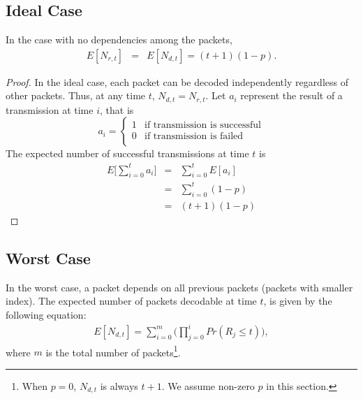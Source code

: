 \subsection{Ideal Case}
\begin{theorem}
\label{t:model:ideal}
    In the case with no dependencies among the packets,
    \begin{eqnarray*}
    E[N_{r,t}] &=& E[N_{d,t}] = (t+1)(1-p).
    \end{eqnarray*}
\end{theorem}
    \begin{proof}
    In the ideal case, each packet can be decoded independently
    regardless of other packets.  Thus, at any time $t$,
    $N_{d,t} = N_{r,t}$.
    Let $a_i$ represent the result of a transmission at time $i$,  
    that is
    \begin{displaymath}
    a_i = \left\{\begin{array}{ll}
    1 & \textrm{if transmission is successful}\\
    0 & \textrm{if transmission is failed}\\
    \end{array}\right.
    \end{displaymath}
    The expected number of successful transmissions at time $t$ is
    \begin{eqnarray*}
    E\big[\sum_{i=0}^{t}a_i\big] &=& \sum_{i=0}^{t}E[a_i]\\
                                &=& \sum_{i=0}^{t}(1-p)\\
                                &=& (t+1)(1-p)
    \end{eqnarray*}
    \QED
    \end{proof}

\subsection{Worst Case}

    

    In the worst case, a packet depends on all previous packets (packets
    with smaller index).  The expected number of packets decodable at
    time $t$, is given by the following equation:
    \begin{eqnarray}
    \label{e:model:endt}
    E[N_{d,t}] = \sum_{i=0}^{m} \big(\prod_{j=0}^i Pr(R_j \le t)\big),
    \end{eqnarray}
    where $m$ is the total number of packets\footnote{When $p=0$, $N_{d,t}$ is always $t+1$.  We assume non-zero $p$ in this section.}.

